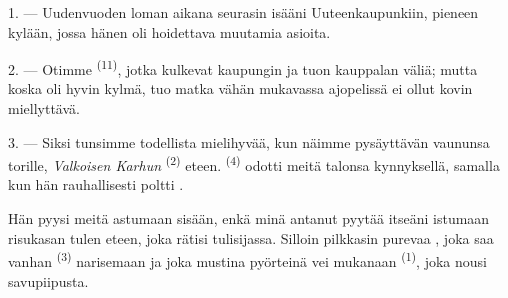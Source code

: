 %


\VUsaut{4.0mm}
\VUsaut{3.0mm}
\VUfilet{16mm}
\VUsaut{5.6mm}
\VUsaut{3.0mm}

\VUsaut{3.0mm}

\VUsaut{4.0mm}

1. --- Uudenvuoden loman aikana seurasin isääni Uuteenkaupunkiin, pieneen
kylään, jossa hänen oli hoidettava muutamia asioita.

2. --- Otimme  \textsuperscript{(11)}, jotka kulkevat
kaupungin ja tuon kauppalan väliä; mutta koska oli hyvin kylmä, tuo matka
vähän mukavassa ajopelissä ei ollut kovin miellyttävä.

3. --- Siksi tunsimme todellista mielihyvää, kun näimme 
pysäyttävän vaununsa torille, \textit{Valkoisen Karhun} 
\textsuperscript{(2)} eteen.  \textsuperscript{(4)}
odotti meitä talonsa kynnyksellä, samalla kun hän rauhallisesti poltti
.

Hän pyysi meitä astumaan sisään, enkä minä antanut pyytää itseäni istumaan
risukasan tulen eteen, joka rätisi tulisijassa. Silloin pilkkasin purevaa
, joka saa vanhan  \textsuperscript{(3)}
narisemaan ja joka mustina pyörteinä vei mukanaan 
\textsuperscript{(1)}, joka nousi savupiipusta.

